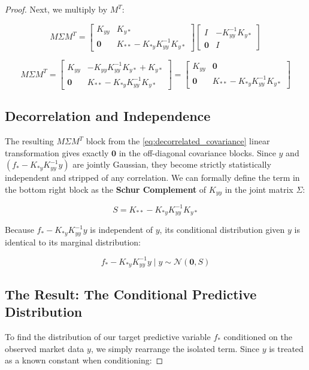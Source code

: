\documentclass[12pt,oneside]{report}
\theoremstyle{definition}
\theoremstyle{remark}
\begin{document}
\begin{proof}
Next, we multiply by $M^T$:


$$M \Sigma M^T = \begin{bmatrix} K_{yy} & K_{y*} \\ \mathbf{0} & K_{**} - K_{*y}K_{yy}^{-1}K_{y*} \end{bmatrix} \begin{bmatrix} I & -K_{yy}^{-1}K_{y*} \\ \mathbf{0} & I \end{bmatrix}$$

\begin{equation}
M \Sigma M^T = \begin{bmatrix} K_{yy} & -K_{yy}K_{yy}^{-1}K_{y*} + K_{y*} \\ \mathbf{0} & K_{**} - K_{*y}K_{yy}^{-1}K_{y*} \end{bmatrix} = \begin{bmatrix} K_{yy} & \mathbf{0} \\ \mathbf{0} & K_{**} - K_{*y}K_{yy}^{-1}K_{y*} \end{bmatrix}
\label{eq:decorrelated_covariance}
\end{equation}

\subsection{Decorrelation and Independence}

The resulting $M \Sigma M^T$ block from the \ref{eq:decorrelated_covariance} linear transformation gives exactly $\mathbf{0}$ in the off-diagonal covariance blocks. Since $y$ and $(f_* - K_{*y}K_{yy}^{-1}y)$ are jointly Gaussian, they become strictly statistically independent and stripped of any correlation. We can formally define the term in the bottom right block as the \textbf{Schur Complement} of $K_{yy}$ in the joint matrix $\Sigma$:

$$S = K_{**} - K_{*y}K_{yy}^{-1}K_{y*}$$

Because $f_* - K_{*y}K_{yy}^{-1}y$ is independent of $y$, its conditional distribution given $y$ is identical to its marginal distribution:


$$f_* - K_{*y}K_{yy}^{-1}y \mid y \sim \mathcal{N}(\mathbf{0}, S)$$

\subsection{The Result: The Conditional Predictive Distribution}

To find the distribution of our target predictive variable $f_*$ conditioned on the observed market data $y$, we simply rearrange the isolated term. Since $y$ is treated as a known constant when conditioning:


\end{proof}
\end{document}

